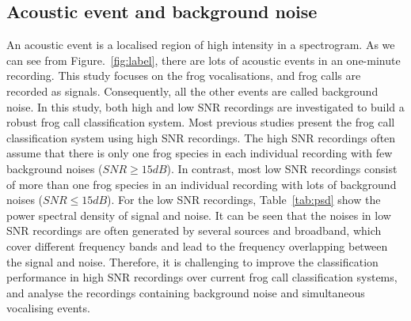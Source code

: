 \subsection{Acoustic event and background noise}
An acoustic event is a localised region of high intensity in a spectrogram. As we can see from Figure.~\ref{fig:label}, there are lots of acoustic events in an one-minute recording. This study focuses on the frog vocalisations, and frog calls are recorded as signals. Consequently, all the other events are called background noise. 
In this study, both high and low SNR recordings are investigated to build a robust frog call classification system. Most previous studies present the frog call classification system using high SNR recordings. The high SNR recordings often assume that there is only one frog species in each individual recording with few background noises ($SNR \geq 15 dB$). In contrast, most low SNR recordings consist of more than one frog species in an individual recording with lots of background noises ($SNR \leq 15 dB$). For the low SNR recordings, Table~\ref{tab:psd} show the power spectral density of signal and noise. It can be seen that the noises in low SNR recordings are often generated by several sources and broadband, which cover different frequency bands and lead to the frequency overlapping between the signal and noise. 
Therefore, it is challenging to improve the classification performance in high SNR recordings over current frog call classification systems, and analyse the recordings containing background noise and simultaneous vocalising events.




